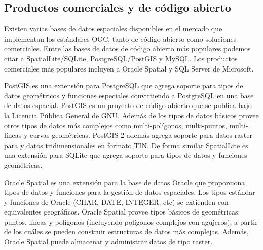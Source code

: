 \subsection{Productos comerciales y de código abierto}

Existen varias bases de datos espaciales disponibles en el mercado que implementan los estándares OGC, tanto de código abierto como soluciones comerciales. Entre las bases de datos de código abierto más populares podemos citar a SpatialLite/SQLite, PostgreSQL/PostGIS y MySQL. Los productos comerciales más populares incluyen a Oracle Spatial y SQL Server de Microsoft.

PostGIS es una extensión para PostgreSQL que agrega soporte para tipos de datos geométricos y funciones especiales convirtiendo a PostgreSQL en una base de datos espacial. PostGIS es un proyecto de código abierto que se publica bajo la Licencia Pública General de GNU. Además de los tipos de datos básicos provee otros tipos de datos más complejos como multi-polígonos, multi-puntos, multi-líneas y curvas geométricas. PostGIS 2 además agrega soporte para datos raster para  y datos tridimensionales en formato TIN. De forma similar SpatialLite es una extensión para SQLite que agrega soporte para tipos de datos y funciones geométricas.

Oracle Spatial es una extensión para la base de datos Oracle que proporciona tipos de datos y funciones para la gestión de datos espaciales. Los tipos estándar y funciones de Oracle (CHAR, DATE, INTEGER, etc) se extienden con equivalentes geográficos. Oracle Spatial provee tipos básicos de geométricas: puntos, líneas y polígonos (incluyendo polígonos complejos con agujeros), a partir de los cuáles se pueden construir estructuras de datos más complejas. Además, Oracle Spatial puede almacenar y administrar datos de tipo raster.
